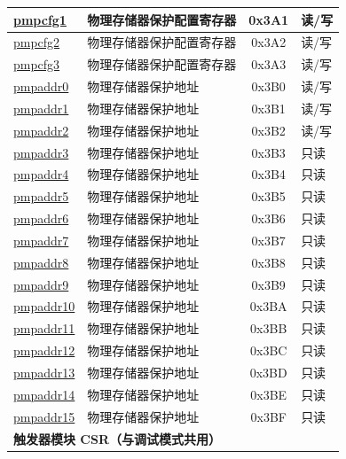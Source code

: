 \begin{longtable}{ | p{4.0cm} | p{8.4cm} | c | l | }
\hyperref[sec:riscvcpu-pmp-reg-desc]{pmpcfg1} & 物理存储器保护配置寄存器 & 0x3A1 & 读/写 \\\hline
\hyperref[sec:riscvcpu-pmp-reg-desc]{pmpcfg2} & 物理存储器保护配置寄存器 & 0x3A2 & 读/写 \\\hline
\hyperref[sec:riscvcpu-pmp-reg-desc]{pmpcfg3} & 物理存储器保护配置寄存器 & 0x3A3 & 读/写 \\\hline
\hyperref[sec:riscvcpu-pmp-reg-desc]{pmpaddr0} & 物理存储器保护地址 & 0x3B0 & 读/写 \\\hline
\hyperref[sec:riscvcpu-pmp-reg-desc]{pmpaddr1} & 物理存储器保护地址 & 0x3B1 & 读/写 \\\hline
\hyperref[sec:riscvcpu-pmp-reg-desc]{pmpaddr2} & 物理存储器保护地址 & 0x3B2 & 读/写 \\\hline
\hyperref[sec:riscvcpu-pmp-reg-desc]{pmpaddr3} & 物理存储器保护地址 & 0x3B3 & 只读 \\\hline
\hyperref[sec:riscvcpu-pmp-reg-desc]{pmpaddr4} & 物理存储器保护地址 & 0x3B4 & 只读 \\\hline
\hyperref[sec:riscvcpu-pmp-reg-desc]{pmpaddr5} & 物理存储器保护地址 & 0x3B5 & 只读 \\\hline
\hyperref[sec:riscvcpu-pmp-reg-desc]{pmpaddr6} & 物理存储器保护地址 & 0x3B6 & 只读 \\\hline
\hyperref[sec:riscvcpu-pmp-reg-desc]{pmpaddr7} & 物理存储器保护地址 & 0x3B7 & 只读 \\\hline
\hyperref[sec:riscvcpu-pmp-reg-desc]{pmpaddr8} & 物理存储器保护地址 & 0x3B8 & 只读 \\\hline
\hyperref[sec:riscvcpu-pmp-reg-desc]{pmpaddr9} & 物理存储器保护地址 & 0x3B9 & 只读 \\\hline
\hyperref[sec:riscvcpu-pmp-reg-desc]{pmpaddr10} & 物理存储器保护地址 & 0x3BA & 只读 \\\hline
\hyperref[sec:riscvcpu-pmp-reg-desc]{pmpaddr11} & 物理存储器保护地址 & 0x3BB & 只读 \\\hline
\hyperref[sec:riscvcpu-pmp-reg-desc]{pmpaddr12} & 物理存储器保护地址 & 0x3BC & 只读 \\\hline
\hyperref[sec:riscvcpu-pmp-reg-desc]{pmpaddr13} & 物理存储器保护地址 & 0x3BD & 只读 \\\hline
\hyperref[sec:riscvcpu-pmp-reg-desc]{pmpaddr14} & 物理存储器保护地址 & 0x3BE & 只读 \\\hline
\hyperref[sec:riscvcpu-pmp-reg-desc]{pmpaddr15} & 物理存储器保护地址 & 0x3BF & 只读 \\\hline
\multicolumn{4}{|l|}{\textbf{触发器模块 CSR（与调试模式共用）}} \\\hline

\end{longtable}
